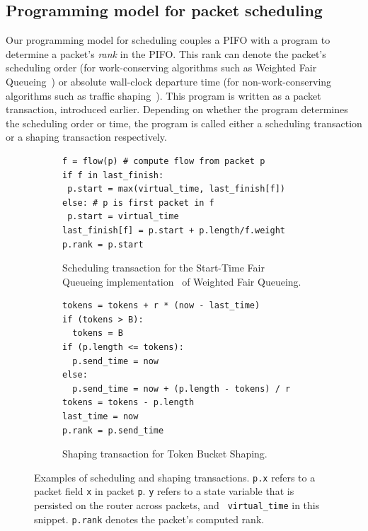 \subsection{Programming model for packet scheduling} Our programming model for
scheduling couples a PIFO with a program to determine a packet's {\em rank} in
the PIFO. This rank can denote the packet's scheduling order (for
work-conserving algorithms such as Weighted Fair Queueing~\cite{wfq}) or
absolute wall-clock departure time (for non-work-conserving algorithms such as
traffic shaping~\cite{tbf}). This program is written as a packet transaction,
introduced earlier.  Depending on whether the program determines the scheduling
order or time, the program is called either a scheduling transaction or a
shaping transaction respectively.

\begin{figure}
\begin{subfigure}[!h]{0.48\textwidth}
\vspace{0.4in}
\begin{lstlisting}[style=customcscriptsize]
f = flow(p) # compute flow from packet p
if f in last_finish:
 p.start = max(virtual_time, last_finish[f])
else: # p is first packet in f
 p.start = virtual_time
last_finish[f] = p.start + p.length/f.weight
p.rank = p.start
\end{lstlisting}
\caption{Scheduling transaction for the Start-Time Fair Queueing
implementation~\cite{stfq} of Weighted Fair Queueing.}
\label{fig:wfq_trans}
\hfill
\end{subfigure}
\begin{subfigure}[!h]{0.48\textwidth}
\begin{lstlisting}[style=customcscriptsize]
tokens = tokens + r * (now - last_time)
if (tokens > B):
  tokens = B
if (p.length <= tokens):
  p.send_time = now
else:
  p.send_time = now + (p.length - tokens) / r
tokens = tokens - p.length
last_time = now
p.rank = p.send_time
\end{lstlisting}
\caption{Shaping transaction for Token Bucket Shaping.}
\label{fig:tbf_trans}
\end{subfigure}
\vspace{-0.25in}
\caption{Examples of scheduling and shaping transactions. {\tt p.x} refers to a
packet field {\tt x} in packet {\tt p}.  {\tt y} refers to a state variable
that is persisted on the router across packets,  and {\tt
virtual\_time} in this snippet. {\tt p.rank} denotes the packet's computed
rank.}
\label{fig:example_transactions}
\end{figure}

